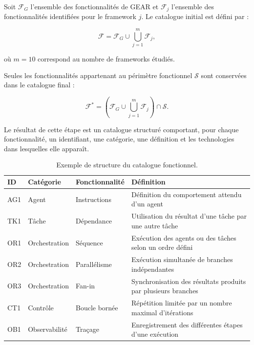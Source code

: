 Soit $\mathcal{F}_{G}$ l'ensemble des fonctionnalités de GEAR et
$\mathcal{F}_{j}$ l'ensemble des fonctionnalités identifiées pour le
framework $j$. Le catalogue initial est défini par :

\begin{equation}
\mathcal{F}
=
\mathcal{F}_{G}
\cup
\bigcup_{j=1}^{m}\mathcal{F}_{j},
\label{eq:union-fonctionnalites}
\end{equation}

où $m=10$ correspond au nombre de frameworks étudiés.

Seules les fonctionnalités appartenant au périmètre fonctionnel
$\mathcal{S}$ sont conservées dans le catalogue final :

\begin{equation}
\mathcal{F}^{*}
=
\left(
\mathcal{F}_{G}
\cup
\bigcup_{j=1}^{m}\mathcal{F}_{j}
\right)
\cap \mathcal{S}.
\label{eq:catalogue-final}
\end{equation}

Le résultat de cette étape est un catalogue structuré comportant, pour
chaque fonctionnalité, un identifiant, une catégorie, une définition
et les technologies dans lesquelles elle apparaît.

\begin{table}[t]
    \centering
    \caption{Exemple de structure du catalogue fonctionnel.}
    \label{tab:catalogue-fonctionnel}
    \begin{tabularx}{\textwidth}{@{}l l l >{\raggedright\arraybackslash}X@{}}
        \toprule
        \textbf{ID}
        & \textbf{Catégorie}
        & \textbf{Fonctionnalité}
        & \textbf{Définition} \\
        \midrule
        AG1
            & Agent
            & Instructions
            & Définition du comportement attendu d'un agent \\
        TK1
            & Tâche
            & Dépendance
            & Utilisation du résultat d'une tâche par une autre tâche \\
        OR1
            & Orchestration
            & Séquence
            & Exécution des agents ou des tâches selon un ordre défini \\
        OR2
            & Orchestration
            & Parallélisme
            & Exécution simultanée de branches indépendantes \\
        OR3
            & Orchestration
            & Fan-in
            & Synchronisation des résultats produits par plusieurs
              branches \\
        CT1
            & Contrôle
            & Boucle bornée
            & Répétition limitée par un nombre maximal d'itérations \\
        OB1
            & Observabilité
            & Traçage
            & Enregistrement des différentes étapes d'une exécution \\
        \bottomrule
    \end{tabularx}
\end{table}

